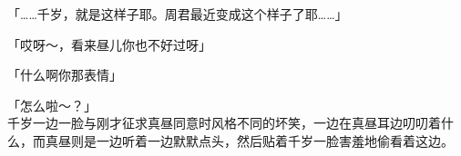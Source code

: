 「……千岁，就是这样子耶。周君最近变成这个样子了耶……」

「哎呀～，看来昼儿你也不好过呀」

「什么啊你那表情」

「怎么啦～？」\\

千岁一边一脸与刚才征求真昼同意时风格不同的坏笑，一边在真昼耳边叨叨着什么，而真昼则是一边听着一边默默点头，然后贴着千岁一脸害羞地偷看着这边。
